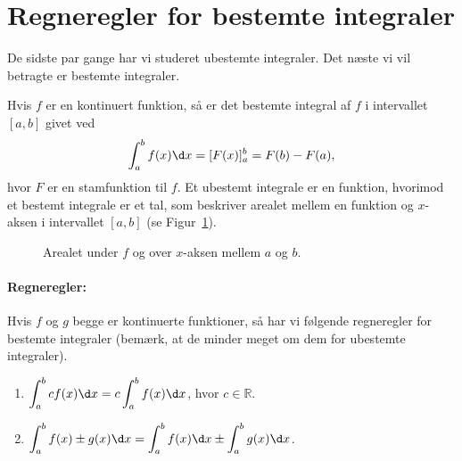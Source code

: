 \section{Regneregler for bestemte integraler}
\noindent De sidste par gange har vi studeret ubestemte integraler. Det næste vi vil betragte er bestemte integraler. 

Hvis $f$ er en kontinuert funktion, så er det bestemte integral af $f$ i intervallet $[a,b]$ givet ved
\begin{align*}
\int_a^b f(x) \d x = [F(x)]^b_a = F(b)-F(a),
\end{align*}
hvor $F$ er en stamfunktion til $f$. Et ubestemt integrale er en funktion, hvorimod et bestemt integrale er et tal, som beskriver arealet mellem en funktion og $x$-aksen i intervallet $[a,b]$ (se Figur~\ref{fig:bestemtint1et}).
\begin{figure}[!htbp]
  \centering
  \caption{Arealet under $f$ og over $x$-aksen mellem $a$ og $b$.}
  \label{fig:bestemtint1et}
\end{figure}

\paragraph*{Regneregler:}
Hvis $f$ og $g$ begge er kontinuerte funktioner, så har vi følgende regneregler for bestemte integraler (bemærk, at de minder meget om dem for ubestemte integraler).
\begin{enumerate}
\item $\displaystyle \int_a^b cf(x) \d x = c \int_a^b f(x) \d x$, hvor $c \in \mathbb{R}$.
\item $\displaystyle \int_a^b f(x) \pm g(x) \d x = \int_a^b f(x) \d x \pm \int_a^b g(x) \d x$.
\end{enumerate}

